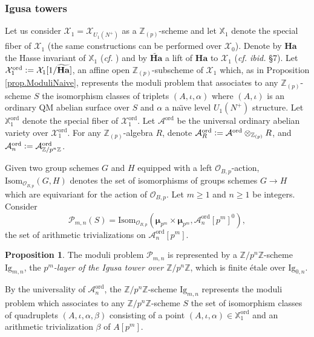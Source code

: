 \documentclass[a4paper]{amsart}
\numberwithin{equation}{section}
\theoremstyle{definition}
\newtheorem{proposition}[theorem]{Proposition}
\newcommand{\Z}{\mathbb{Z}}
\newcommand{\X}{\mathbb{X}}
\newcommand{\defeq}{\vcentcolon=}
\newcommand{\ord}{\mathrm{ord}}
\begin{document}
\subsubsection{Igusa towers}\label{subsec.IgusaTowers}
Let us consider $\mathcal{X}_1=\mathcal{X}_{U_1(N^{+})}$ as a $\Z_{(p)}$-scheme and let $\X_1$ denote the special fiber of $\mathcal{X}_1$ (the same constructions can be performed over $\mathcal{X}_0$). 
Denote by $\mathbf{Ha}$ the Hasse invariant of $\X_1$ (\textit{cf.} \cite[\S6]{Kassaei}) and by $\widetilde{\mathbf{Ha}}$ a lift of $\mathbf{Ha}$ to $\mathcal{X}_1$ (\textit{cf. ibid.} \S7). Let $\mathcal{X}_1^\ord\defeq\mathcal{X}_1[1/\widetilde{\mathbf{Ha}}]$, an affine open $\Z_{(p)}$-subscheme of $\mathcal{X}_1$ which, as in Proposition \ref{prop.ModuliNaive}, represents the moduli problem that associates to any $\Z_{(p)}$-scheme $S$ the isomorphism classes of triplets $(A,\iota,\alpha)$ where $(A,\iota)$ is an ordinary QM abelian surface over $S$ and $\alpha$ a na\"{\i}ve level $U_1(N^+)$ structure. Let $\X_1^\mathrm{ord}$ denote the special fiber of $\mathcal{X}_1^\ord$. Let $\mathcal{A}^\ord$ be the universal ordinary abelian variety over $\mathcal{X}_1^\ord$. For any $\Z_{(p)}$-algebra $R$, denote $\mathcal{A}^\ord_R\defeq \mathcal{A}^\ord\otimes_{\Z_{(p)}}R$, and $\mathcal{A}^\ord_n\defeq \mathcal{A}^\ord_{\Z/p^n\Z}$.

Given two group schemes $G$ and $H$ equipped with a left $\mathcal{O}_{B,p}$-action, 
$\mathrm{Isom}_{\mathcal{O}_{B,p}}(G,H)$ denotes the set of isomorphisms of groups schemes $G\rightarrow H$ which are equivariant for the action of $\mathcal{O}_{B,p}$. Let $m\geq 1$ and $n\geq 1$ be integers. Consider 
\[\mathcal{P}_{m,n}(S)=\mathrm{Isom}_{\mathcal{O}_{B,p}}\left(\boldsymbol{\mu}_{p^m}\times\boldsymbol{\mu}_{p^m},\mathcal{A}_n^\ord[p^m]^0\right),\]
the set of arithmetic trivializations on $\mathcal{A}^\ord_{n}[p^m]$. 

\begin{proposition}\label{prop.ModuliIgusa}
The moduli problem $\mathcal{P}_{m,n}$ is represented by a $\Z/p^n\Z$-scheme $\mathrm{Ig}_{m,n}$, the \emph{$p^m$-layer of the Igusa tower over $\Z/p^n\Z$}, which is finite étale over $\mathrm{Ig}_{0,n}$.
\end{proposition}

By the universality of $\mathcal{A}^\ord_n$, 
the $\Z/p^n\Z$-scheme $\mathrm{Ig}_{m,n}$ represents the moduli problem which associates 
to any $\Z/p^n\Z$-scheme $S$ the set of isomorphism classes of quadruplets $(A,\iota,\alpha,\beta)$ consisting of a point $(A,\iota,\alpha)\in\X^\mathrm{ord}_1$ and an arithmetic trivialization $\beta$ of $A[p^m]$. 
\end{document}

